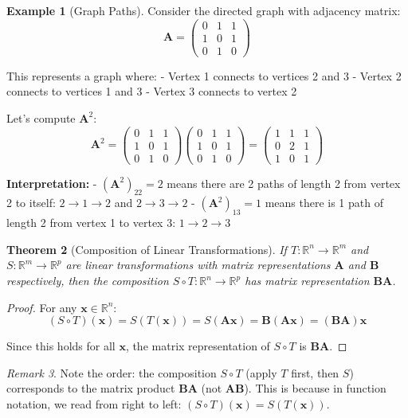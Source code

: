\documentclass[12pt]{article}
\numberwithin{equation}{section}
\newcommand{\RR}{\mathbb{R}}
\newcommand{\vect}[1]{\boldsymbol{#1}}   %
\newcommand{\mat}[1]{\mathbf{#1}}        %
\theoremstyle{plain}
\newtheorem{theorem}{Theorem}[section]
\theoremstyle{definition}
\newtheorem{example}[theorem]{Example}
\theoremstyle{remark}
\newtheorem{remark}[theorem]{Remark}
\begin{document}
\begin{example}[Graph Paths]
Consider the directed graph with adjacency matrix:
$$\mat{A} = \begin{pmatrix} 0 & 1 & 1 \\ 1 & 0 & 1 \\ 0 & 1 & 0 \end{pmatrix}$$

This represents a graph where:
- Vertex 1 connects to vertices 2 and 3
- Vertex 2 connects to vertices 1 and 3  
- Vertex 3 connects to vertex 2

Let's compute $\mat{A}^2$:
$$\mat{A}^2 = \begin{pmatrix} 0 & 1 & 1 \\ 1 & 0 & 1 \\ 0 & 1 & 0 \end{pmatrix}\begin{pmatrix} 0 & 1 & 1 \\ 1 & 0 & 1 \\ 0 & 1 & 0 \end{pmatrix} = \begin{pmatrix} 1 & 1 & 1 \\ 0 & 2 & 1 \\ 1 & 0 & 1 \end{pmatrix}$$

\textbf{Interpretation:} 
- $(\mat{A}^2)_{22} = 2$ means there are 2 paths of length 2 from vertex 2 to itself: $2 \to 1 \to 2$ and $2 \to 3 \to 2$
- $(\mat{A}^2)_{13} = 1$ means there is 1 path of length 2 from vertex 1 to vertex 3: $1 \to 2 \to 3$
\end{example}

\begin{theorem}[Composition of Linear Transformations]
If $T: \RR^n \to \RR^m$ and $S: \RR^m \to \RR^p$ are linear transformations with matrix representations $\mat{A}$ and $\mat{B}$ respectively, then the composition $S \circ T: \RR^n \to \RR^p$ has matrix representation $\mat{B}\mat{A}$.
\end{theorem}

\begin{proof}
For any $\vect{x} \in \RR^n$:
$$(S \circ T)(\vect{x}) = S(T(\vect{x})) = S(\mat{A}\vect{x}) = \mat{B}(\mat{A}\vect{x}) = (\mat{B}\mat{A})\vect{x}$$

Since this holds for all $\vect{x}$, the matrix representation of $S \circ T$ is $\mat{B}\mat{A}$.
\end{proof}

\begin{remark}
Note the order: the composition $S \circ T$ (apply $T$ first, then $S$) corresponds to the matrix product $\mat{B}\mat{A}$ (not $\mat{A}\mat{B}$). This is because in function notation, we read from right to left: $(S \circ T)(\vect{x}) = S(T(\vect{x}))$.
\end{remark}
\end{document}
